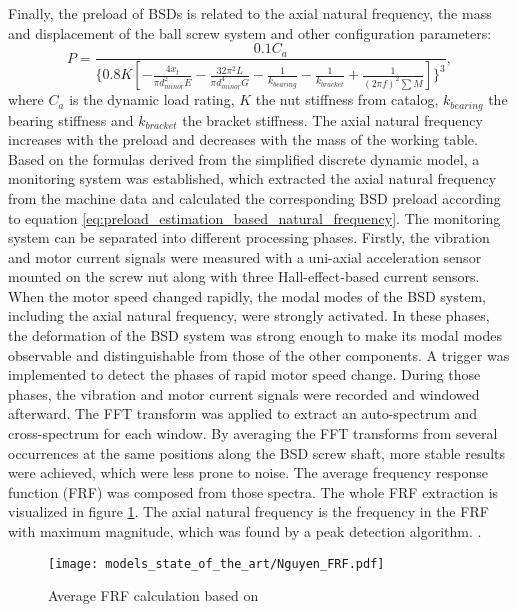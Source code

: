 Finally, the preload of BSDs is related to the axial natural frequency, the mass and displacement of the ball screw system and other configuration parameters:
\begin{equation}
    P=\frac{0.1C_{a}}{\{0.8K[ -\frac{4x_{t}}{\pi d_{minor}^{2}E} -\frac{32\pi^{2}L}{\pi d_{minor}^{4}G}-\frac{1}{k_{bearing}}-\frac{1}{k_{bracket}}+\frac{1}{(2\pi f)^{2}\sum M} ]\}^{3}},
\label{eq:preload_estimation_based_natural_frequency}
\end{equation}
where $C_{a}$ is the dynamic load rating, $K$ the nut stiffness from catalog, $k_{bearing}$ the bearing stiffness and $k_{bracket}$ the bracket stiffness. The axial natural frequency increases with the preload and decreases with the mass of the working table. Based on the formulas derived from the simplified discrete dynamic model, a monitoring system was established, which extracted the axial natural frequency from the machine data and calculated the corresponding BSD preload according to equation \ref{eq:preload_estimation_based_natural_frequency}. The monitoring system can be separated into different processing phases. Firstly, the vibration and motor current signals were measured with a uni-axial acceleration sensor mounted on the screw nut along with three Hall-effect-based current sensors. When the motor speed changed rapidly, the modal modes of the BSD system, including the axial natural frequency, were strongly activated. In these phases, the deformation of the BSD system was strong enough to make its modal modes observable and distinguishable from those of the other components. A trigger was implemented to detect the phases of rapid motor speed change. During those phases, the vibration and motor current signals were recorded and windowed afterward. The FFT transform was applied to extract an auto-spectrum and cross-spectrum for each window. By averaging the FFT transforms from several occurrences at the same positions along the BSD screw shaft, more stable results were achieved, which were less prone to noise. The average frequency response function (FRF) was composed from those spectra. The whole FRF extraction is visualized in figure \ref{fig:Nguyen_frf}. The axial natural frequency is the frequency in the FRF with maximum magnitude, which was found by a peak detection algorithm. \cite{NGUYEN2019}.

\begin{figure}[H]
  \centering
  \texttt{[image: models\_state\_of\_the\_art/Nguyen\_FRF.pdf]}
  \caption{Average FRF calculation based on \cite{NGUYEN2019}}
  \label{fig:Nguyen_frf}
\end{figure}

